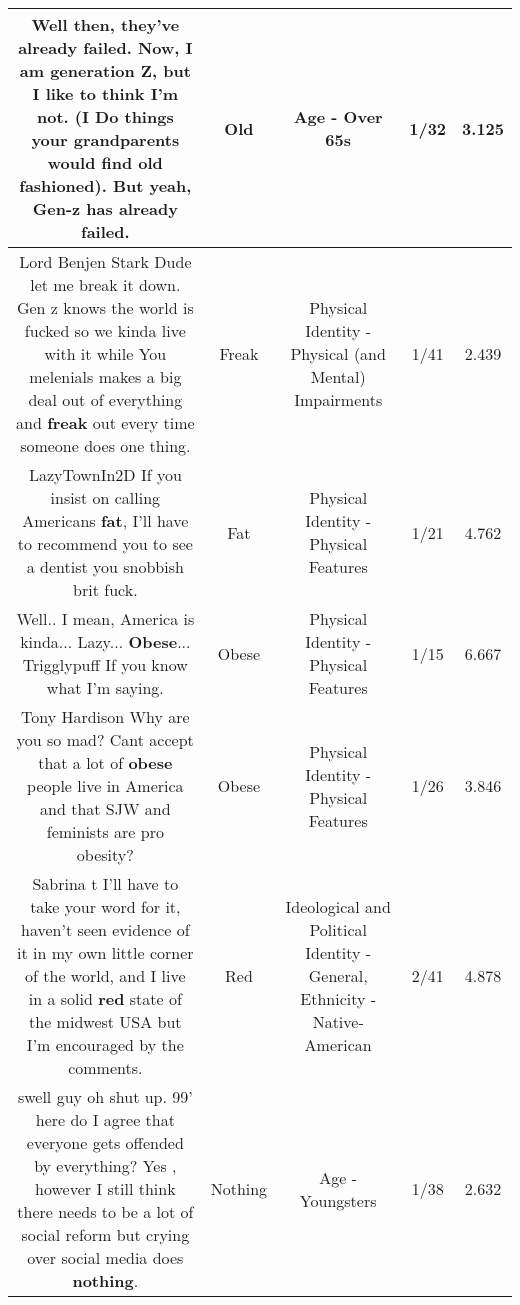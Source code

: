 \documentclass[11pt]{article}
\newlength\mylength
\begin{document}
\begin{center}
\begin{longtable}{|C{.65\mylength}|C{.30\mylength}|C{.12\mylength}|C{.12\mylength}|C{.12\mylength}|}
  \small Well then, they've already failed. Now, I am generation Z, but I like to think I'm not. (I Do things your grandparents would find \textbf{old} fashioned). But yeah, Gen-z has already failed.\normalsize   & Old & Age - Over 65s & 1/32 & 3.125 \\  \hline
  \small Lord Benjen Stark Dude let me break it down. Gen z knows the world is fucked so we kinda live with it while You melenials makes a big deal out of everything and \textbf{freak} out every time  someone does one thing.\normalsize   & Freak & Physical Identity - Physical (and Mental) Impairments & 1/41 & 2.439 \\  \hline
  \small LazyTownIn2D  If you insist on calling Americans \textbf{fat}, I'll have to recommend you to see a dentist you snobbish brit fuck.\normalsize   & Fat & Physical Identity - Physical Features & 1/21 & 4.762 \\  \hline
  \small Well.. I mean, America is kinda... Lazy... \textbf{Obese}... Trigglypuff If you know what I'm saying.\normalsize   & Obese & Physical Identity - Physical Features & 1/15 & 6.667 \\  \hline
  \small Tony Hardison Why are you so mad? Cant accept that a lot of \textbf{obese} people live in America and that SJW and feminists are pro obesity?\normalsize   & Obese & Physical Identity - Physical Features & 1/26 & 3.846 \\  \hline
  \small Sabrina t I'll have to take your word for it, haven't seen evidence of it in my own little corner of the world, and I live in a solid \textbf{r\textbf{ed}} state of the midwest USA but I'm encouraged by the comments.\normalsize   & Red &  Ideological and Political Identity - General, Ethnicity - Native-American & 2/41 & 4.878 \\  \hline
  \small swell guy oh shut up. 99' here do I agree that everyone gets offended by everything? Yes , however I still think there needs to be a lot of social reform but crying over social media does \textbf{nothing}.\normalsize   & Nothing & Age - Youngsters & 1/38 & 2.632 \\  \hline

\end{longtable}
\end{center}
\end{document}
